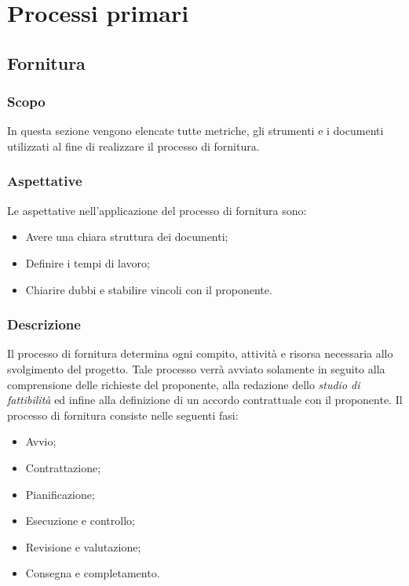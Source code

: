 
\section{Processi primari}\label{section:Processi_primari}
\subsection{Fornitura} \label{subsection:Fornitura}
\subsubsection{Scopo}\label{subsubsection: scopo_fornitura}
In questa sezione vengono elencate tutte metriche, gli strumenti e i documenti utilizzati al fine di realizzare il processo di fornitura.
\subsubsection{Aspettative}\label{subsubsection: aspettative_fornitura}
Le aspettative nell'applicazione del processo di fornitura sono:
\begin {itemize}
    \item Avere una chiara struttura dei documenti;
    \item Definire i tempi di lavoro;
    \item Chiarire dubbi e stabilire vincoli con il proponente.
\end {itemize}
\subsubsection{Descrizione}\label{subsubsection: descrizione_fornitura}
Il processo di fornitura determina ogni compito, attività e risorsa necessaria allo svolgimento del progetto.
Tale processo verrà avviato solamente in seguito alla comprensione delle richieste del proponente, alla redazione dello \textit{studio di fattibilità} ed infine alla definizione di un accordo contrattuale con il proponente.
Il processo di fornitura consiste nelle seguenti fasi:
\begin {itemize}
    \item Avvio;
    \item Contrattazione;
    \item Pianificazione;
    \item Esecuzione e controllo;
    \item Revisione e valutazione;
    \item Consegna e completamento.
\end {itemize}
